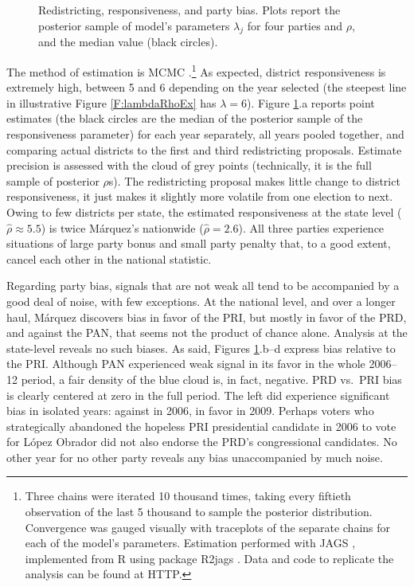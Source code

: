 \documentclass[letter,12pt]{article}
\begin{document}
\begin{figure}
\begin{center}
\begin{tabular}{cc}
  \end{tabular}
  \caption{Redistricting, responsiveness, and party bias. Plots report the posterior sample of model's parameters $\lambda_j$ for four parties and $\rho$, and the median value (black circles).}\label{F:posterior_s0s1s3}
\end{center}
\end{figure}


The  method of estimation is MCMC \citep{jackman.2000}.\footnote{Three chains were iterated 10 thousand times, taking every fiftieth observation of the last 5 thousand to sample the posterior distribution. Convergence was gauged visually with traceplots of the separate chains for each of the model's parameters. Estimation performed with JAGS \citep{jags.cite}, implemented from R \citep{r.cite} using package R2jags \citep{r.r2jags}. Data and code to replicate the analysis can be found at HTTP.} As expected, district responsiveness is extremely high, between 5 and 6 depending on the year selected (the steepest line in illustrative Figure \ref{F:lambdaRhoEx} has $\lambda=6$). Figure \ref{F:posterior_s0s1s3}.a reports point estimates (the black circles are the median of the posterior sample of the responsiveness parameter) for each year separately, all years pooled together, and comparing actual districts to the first and third redistricting proposals. Estimate precision is assessed with the cloud of grey points (technically, it is the full sample of posterior $\rho$s). The redistricting proposal makes little change to district responsiveness, it just makes it slightly more volatile from one election to next. Owing to few districts per state, the estimated responsiveness at the state level ($\hat{\rho} \approx 5.5$) is twice M\'arquez's nationwide ($\hat{\rho} = 2.6$). All three parties experience situations of large party bonus and small party penalty that, to a good extent, cancel each other in the national statistic.

Regarding party bias, signals that are not weak all tend to be accompanied by a good deal of noise, with few exceptions. At the national level, and over a longer haul, M\'arquez discovers bias in favor of the PRI, but mostly in favor of the PRD, and against the PAN, that seems not the product of chance alone. Analysis at the state-level reveals no such biases. As said, Figures \ref{F:posterior_s0s1s3}.b--d express bias relative to the PRI. Although PAN experienced weak signal in its favor in the whole 2006--12 period, a fair density of the blue cloud is, in fact, negative. PRD vs.\ PRI bias is clearly centered at zero in the full period. The left did experience significant bias in isolated years: against in 2006, in favor in 2009. Perhaps voters who strategically abandoned the hopeless PRI presidential candidate in 2006 to vote for L\'opez Obrador did not also endorse the PRD's congressional candidates. No other year for no other party reveals any bias unaccompanied by much noise.
\end{document}
